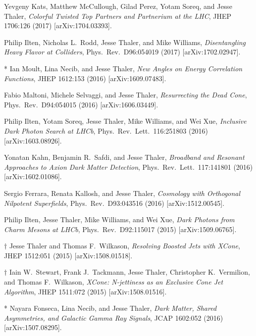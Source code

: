 \begin{list}{[]\addtocounter{jessecount}{-1}}{\leftmargin=3em \itemsep=4pt}
\item
 Yevgeny Kats, Matthew McCullough, Gilad Perez, Yotam Soreq, and Jesse Thaler,
\emph{Colorful Twisted Top Partners and Partnerium at the LHC},
JHEP 1706:126 (2017)
[arXiv:1704.03393].

\item
 Philip Ilten, Nicholas L.\ Rodd, Jesse Thaler, and Mike Williams,
\emph{Disentangling Heavy Flavor at Colliders},
Phys.\ Rev.\ D96:054019 (2017)
[arXiv:1702.02947].

\item
* Ian Moult, Lina Necib, and Jesse Thaler,
\emph{New Angles on Energy Correlation Functions},
JHEP 1612:153 (2016)
[arXiv:1609.07483].

\item
 Fabio Maltoni, Michele Selvaggi, and Jesse Thaler,
\emph{Resurrecting the Dead Cone},
Phys.\ Rev.\ D94:054015 (2016)
[arXiv:1606.03449].

\item
 Philip Ilten, Yotam Soreq, Jesse Thaler, Mike Williams, and Wei Xue,
\emph{Inclusive Dark Photon Search at LHCb},
Phys.\ Rev.\ Lett.\ 116:251803 (2016)
[arXiv:1603.08926].

\item
 Yonatan Kahn, Benjamin R.\ Safdi, and Jesse Thaler,
\emph{Broadband and Resonant Approaches to Axion Dark Matter Detection},
Phys.\ Rev.\ Lett.\ 117:141801 (2016)
[arXiv:1602.01086].

\item
 Sergio Ferrara, Renata Kallosh, and Jesse Thaler,
\emph{Cosmology with Orthogonal Nilpotent Superfields},
Phys.\ Rev.\ D93:043516 (2016)
[arXiv:1512.00545].

\item
 Philip Ilten, Jesse Thaler, Mike Williams, and Wei Xue,
\emph{Dark Photons from Charm Mesons at LHCb},
Phys.\ Rev.\ D92:115017 (2015)
[arXiv:1509.06765].

\item
$\dagger$ Jesse Thaler and Thomas F.\ Wilkason,
\emph{Resolving Boosted Jets with XCone},
JHEP 1512:051 (2015)
[arXiv:1508.01518].

\item
$\dagger$ Iain W.\ Stewart, Frank J.\ Tackmann, Jesse Thaler, Christopher K.\ Vermilion, and Thomas F.\ Wilkason,
\emph{XCone: N-jettiness as an Exclusive Cone Jet Algorithm},
JHEP 1511:072 (2015)
[arXiv:1508.01516].

\item
* Nayara Fonseca, Lina Necib, and Jesse Thaler,
\emph{Dark Matter, Shared Asymmetries, and Galactic Gamma Ray Signals},
JCAP 1602:052 (2016)
[arXiv:1507.08295].


\end{list}
